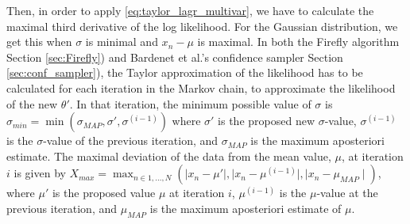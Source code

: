 Then, in order to apply \eqref{eq:taylor_lagr_multivar}, we have to calculate the maximal third derivative of the log likelihood.
For the Gaussian distribution, we get this when $\sigma$ is minimal and $x_n - \mu$ is maximal.
In both the Firefly algorithm Section \ref{sec:Firefly}) and Bardenet et al.'s confidence sampler Section \ref{sec:conf_sampler}), the Taylor approximation of the likelihood has to be calculated for each iteration in the Markov chain, to approximate the likelihood of the new $\theta'$. 
In that iteration, the minimum possible value of $\sigma$ is $\sigma_{min} = \min\left(\sigma_{MAP}, \sigma', \sigma^{(i-1)}\right) $ where $\sigma'$ is the proposed new $\sigma$-value, $\sigma^{(i-1)}$ is the $\sigma$-value of the previous iteration, and $\sigma_{MAP}$ is the maximum aposteriori estimate. 
The maximal deviation of the data from the mean value, $\mu$, at iteration $i$ is given by $X_{max} = \max_{n\in 1,\ldots, N} \left(\mid x_n - \mu'\mid, \mid x_n - \mu^{(i-1)}\mid, \mid x_n - \mu_{MAP}\mid\right)$, where $\mu'$ is the proposed value $\mu$ at iteration $i$, $\mu^{(i-1)}$ is the $\mu$-value at the previous iteration, and $\mu_{MAP}$ is the maximum aposteriori estimate of $\mu$. 
